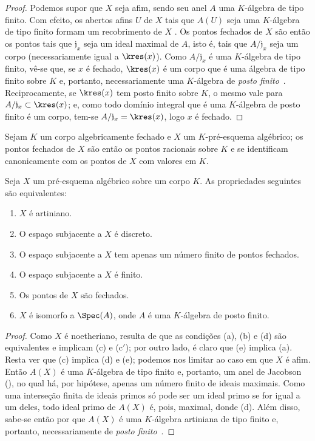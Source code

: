 \documentclass[oneside]{amsart}
\newcommand{\oldpage}[2][]{{\marginnote{\normalfont\textbf{#1}~|~#2}}\ignorespaces}
\let\EGAOriginalLabel\label
\renewcommand{\label}[1]{\phantomsection\EGAOriginalLabel{#1}}
\begin{document}
\begin{proof}
Podemos supor que $X$ seja afim, sendo seu anel $A$ uma $K$-álgebra de tipo
finito.
Com efeito, os abertos afins $U$ de $X$ tais que $A(U)$ seja uma
$K$-álgebra de tipo finito formam um recobrimento de $X$
.
Os pontos fechados de $X$ são então os pontos tais que $\mathfrak{j}_x$ seja
\oldpage[I]{148}
um ideal maximal de $A$, isto é, tais que $A/\mathfrak{j}_x$ seja um corpo
(necessariamente igual a $\kres(x)$).
Como $A/\mathfrak{j}_x$ é uma $K$-álgebra de tipo finito, vê-se que, se $x$
é fechado, $\kres(x)$ é um corpo que é uma álgebra de tipo finito sobre
$K$ e, portanto, necessariamente uma $K$-álgebra de \emph{posto
finito}~\cite{I-21}.
Reciprocamente, se $\kres(x)$ tem posto finito sobre $K$, o mesmo vale para
$A/\mathfrak{j}_x\subset\kres(x)$; e, como todo domínio integral que é uma
$K$-álgebra de posto finito é um corpo, tem-se
$A/\mathfrak{j}_x=\kres(x)$, logo $x$ é fechado.
\end{proof}

\begin{corollary}[6.4.3]
\label{I.6.4.3}
Sejam $K$ um corpo algebricamente fechado e $X$ um $K$-pré-esquema algébrico;
os pontos fechados de $X$ são então os pontos racionais sobre $K$
 e se identificam canonicamente com os pontos de $X$ com
valores em $K$.
\end{corollary}

\begin{proposition}[6.4.4]
\label{I.6.4.4}
Seja $X$ um pré-esquema algébrico sobre um corpo $K$.
As propriedades seguintes são equivalentes:
\begin{enumerate}
  \item[{\rm(a)}] $X$ é artiniano.
  \item[{\rm(b)}] O espaço subjacente a $X$ é discreto.
  \item[{\rm(c)}] O espaço subjacente a $X$ tem apenas um número finito de pontos fechados.
  \item[{\rm(c')}] O espaço subjacente a $X$ é finito.
  \item[{\rm(d)}] Os pontos de $X$ são fechados.
  \item[{\rm(e)}] $X$ é isomorfo a $\Spec(A)$, onde $A$ é uma $K$-álgebra de posto finito.
\end{enumerate}
\end{proposition}

\begin{proof}
Como $X$ é noetheriano, resulta de  que as condições (a), (b) e (d) são equivalentes e implicam (c) e (c$'$);
por outro lado, é claro que (e) implica (a).
Resta ver que (c) implica (d) e (e);
podemos nos limitar ao caso em que $X$ é afim.
Então $A(X)$ é uma $K$-álgebra de tipo finito  e, portanto, um anel de Jacobson (\cite[p.~3-11 e 3-12]{I-1}), no qual há, por hipótese, apenas um número finito de ideais maximais.
Como uma interseção finita de ideais primos só pode ser um ideal primo se for igual a um deles, todo ideal primo de $A(X)$ é, pois, maximal, donde (d).
Além disso, sabe-se então por  que $A(X)$ é uma $K$-álgebra artiniana de tipo finito e, portanto, necessariamente de \emph{posto finito}~\cite{I-21}.
\end{proof}
\end{document}

